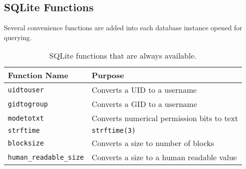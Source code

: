 \clearpage
\subsection{SQLite Functions}
Several convenience functions are added into each database instance
opened for querying.

\begin{table}[htb]
  \centering
  \caption{SQLite functions that are always available.}
  \begin{tabular}{| l | l |}
    \hline
    Function Name & Purpose \\
    \hline
    \texttt{uidtouser} & Converts a UID to a username \\
    \hline
    \texttt{gidtogroup} & Converts a GID to a username \\
    \hline
    \texttt{modetotxt} & Converts numerical permission bits to text \\
    \hline
    \texttt{strftime} & \texttt{strftime(3)} \\
    \hline
    \texttt{blocksize} & Converts a size to number of blocks \\
    \hline
    \texttt{human\_readable\_size} & Converts a size to a human readable value \\
    \hline
  \end{tabular}
\end{table}

